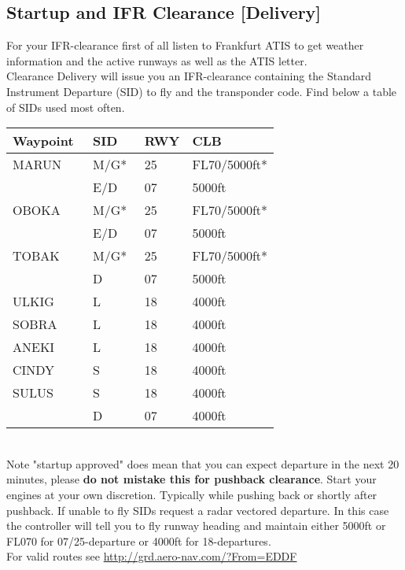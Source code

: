\subsection[DEL]{Startup and IFR Clearance [Delivery]}
For your IFR-clearance first of all listen to Frankfurt ATIS to
get weather information and the active runways as well as
the ATIS letter.\\
Clearance Delivery will issue you an IFR-clearance containing the Standard Instrument Departure (SID) to fly and the transponder code. Find below a table of SIDs used most often.\\
\begin{table}[h]
	\begin{tabular}{|l|l|l|l|}
		\hline
		\textbf{Waypoint} & \textbf{SID}  & \textbf{RWY} & \textbf{CLB}\\\hline
		MARUN    & M/G*	& 25 & FL70/5000ft*	\\
				 & E/D	& 07 & 5000ft   	\\\hline
		OBOKA    & M/G*	& 25 & FL70/5000ft* \\
				 & E/D	& 07 & 5000ft   	\\\hline
		TOBAK    & M/G*	& 25 & FL70/5000ft*	\\
				 & D	& 07 & 5000ft   	\\\hline
		ULKIG    & L    & 18 & 4000ft 		\\\hline
		SOBRA    & L    & 18 & 4000ft 		\\\hline
		ANEKI    & L    & 18 & 4000ft 		\\\hline
		CINDY    & S    & 18 & 4000ft 		\\\hline
		SULUS    & S    & 18 & 4000ft  		\\
				 & D    & 07 & 4000ft 		\\
		\hline
	\end{tabular}
\end{table}
\\
Note "startup approved" does mean that you can expect departure in the next 20 minutes, please \textbf{do not mistake this for pushback clearance}. Start your engines at your own discretion. Typically while pushing back or shortly after
pushback.
If unable to fly SIDs request a radar vectored departure. In this case the controller will tell you to fly runway heading and maintain either 5000ft or FL070 for 07/25-departure or 4000ft for 18-departures.\\
For valid routes see \url{http://grd.aero-nav.com/?From=EDDF}

